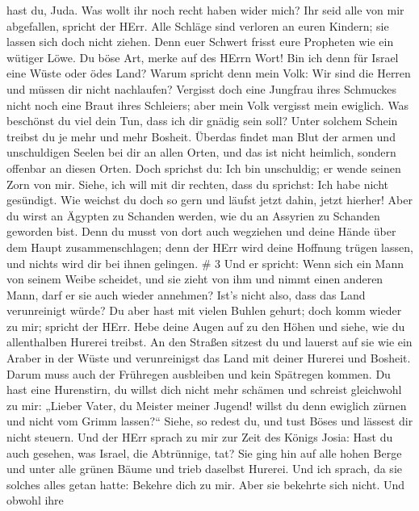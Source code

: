 hast du, Juda.  Was wollt ihr noch recht haben wider mich?
Ihr seid alle von mir abgefallen, spricht der HErr.  Alle
Schläge sind verloren an euren Kindern; sie lassen sich doch nicht
ziehen. Denn euer Schwert frisst eure Propheten wie ein wütiger Löwe.
 Du böse Art, merke auf des HErrn Wort! Bin ich denn für
Israel eine Wüste oder ödes Land? Warum spricht denn mein Volk: Wir sind
die Herren und müssen dir nicht nachlaufen?  Vergisst doch
eine Jungfrau ihres Schmuckes nicht noch eine Braut ihres Schleiers;
aber mein Volk vergisst mein ewiglich.  Was beschönst du
viel dein Tun, dass ich dir gnädig sein soll? Unter solchem Schein
treibst du je mehr und mehr Bosheit.  Überdas findet man
Blut der armen und unschuldigen Seelen bei dir an allen Orten, und das
ist nicht heimlich, sondern offenbar an diesen Orten.  Doch
sprichst du: Ich bin unschuldig; er wende seinen Zorn von mir. Siehe,
ich will mit dir rechten, dass du sprichst: Ich habe nicht gesündigt.
 Wie weichst du doch so gern und läufst jetzt dahin, jetzt
hierher! Aber du wirst an Ägypten zu Schanden werden, wie du an Assyrien
zu Schanden geworden bist.  Denn du musst von dort auch
wegziehen und deine Hände über dem Haupt zusammenschlagen; denn der HErr
wird deine Hoffnung trügen lassen, und nichts wird dir bei ihnen
gelingen. \# 3  Und er spricht: Wenn sich ein Mann von
seinem Weibe scheidet, und sie zieht von ihm und nimmt einen anderen
Mann, darf er sie auch wieder annehmen? Ist's nicht also, dass das Land
verunreinigt würde? Du aber hast mit vielen Buhlen gehurt; doch komm
wieder zu mir; spricht der HErr.  Hebe deine Augen auf zu
den Höhen und siehe, wie du allenthalben Hurerei treibst. An den Straßen
sitzest du und lauerst auf sie wie ein Araber in der Wüste und
verunreinigst das Land mit deiner Hurerei und Bosheit. 
Darum muss auch der Frühregen ausbleiben und kein Spätregen kommen. Du
hast eine Hurenstirn, du willst dich nicht mehr schämen  und
schreist gleichwohl zu mir: „Lieber Vater, du Meister meiner Jugend!
 willst du denn ewiglich zürnen und nicht vom Grimm
lassen?{}`` Siehe, so redest du, und tust Böses und lässest dir nicht
steuern.  Und der HErr sprach zu mir zur Zeit des Königs
Josia: Hast du auch gesehen, was Israel, die Abtrünnige, tat? Sie ging
hin auf alle hohen Berge und unter alle grünen Bäume und trieb daselbst
Hurerei.  Und ich sprach, da sie solches alles getan hatte:
Bekehre dich zu mir. Aber sie bekehrte sich nicht. Und obwohl ihre
